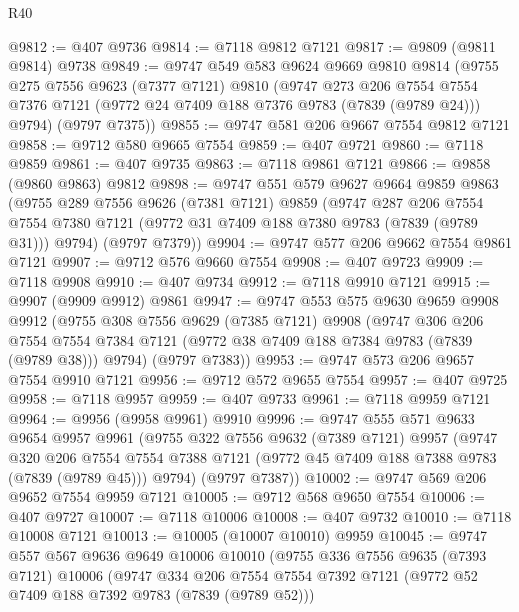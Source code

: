 \begin{lexlean}{R40}
\begin{coremodule}
@9812 := @407 @9736
@9814 := @7118 @9812 @7121
@9817 := @9809 (@9811 @9814) @9738
@9849 := @9747
    @549
    @583
    @9624
    @9669
    @9810
    @9814
    (@9755
      @275
      @7556
      @9623
      (@7377 @7121)
      @9810
      (@9747
        @273
        @206
        @7554
        @7554
        @7376
        @7121
        (@9772 @24 @7409 @188 @7376 @9783 (@7839 (@9789 @24)))
        @9794)
      (@9797 @7375))
@9855 := @9747 @581 @206 @9667 @7554 @9812 @7121
@9858 := @9712 @580 @9665 @7554
@9859 := @407 @9721
@9860 := @7118 @9859
@9861 := @407 @9735
@9863 := @7118 @9861 @7121
@9866 := @9858 (@9860 @9863) @9812
@9898 := @9747
    @551
    @579
    @9627
    @9664
    @9859
    @9863
    (@9755
      @289
      @7556
      @9626
      (@7381 @7121)
      @9859
      (@9747
        @287
        @206
        @7554
        @7554
        @7380
        @7121
        (@9772 @31 @7409 @188 @7380 @9783 (@7839 (@9789 @31)))
        @9794)
      (@9797 @7379))
@9904 := @9747 @577 @206 @9662 @7554 @9861 @7121
@9907 := @9712 @576 @9660 @7554
@9908 := @407 @9723
@9909 := @7118 @9908
@9910 := @407 @9734
@9912 := @7118 @9910 @7121
@9915 := @9907 (@9909 @9912) @9861
@9947 := @9747
    @553
    @575
    @9630
    @9659
    @9908
    @9912
    (@9755
      @308
      @7556
      @9629
      (@7385 @7121)
      @9908
      (@9747
        @306
        @206
        @7554
        @7554
        @7384
        @7121
        (@9772 @38 @7409 @188 @7384 @9783 (@7839 (@9789 @38)))
        @9794)
      (@9797 @7383))
@9953 := @9747 @573 @206 @9657 @7554 @9910 @7121
@9956 := @9712 @572 @9655 @7554
@9957 := @407 @9725
@9958 := @7118 @9957
@9959 := @407 @9733
@9961 := @7118 @9959 @7121
@9964 := @9956 (@9958 @9961) @9910
@9996 := @9747
    @555
    @571
    @9633
    @9654
    @9957
    @9961
    (@9755
      @322
      @7556
      @9632
      (@7389 @7121)
      @9957
      (@9747
        @320
        @206
        @7554
        @7554
        @7388
        @7121
        (@9772 @45 @7409 @188 @7388 @9783 (@7839 (@9789 @45)))
        @9794)
      (@9797 @7387))
@10002 := @9747 @569 @206 @9652 @7554 @9959 @7121
@10005 := @9712 @568 @9650 @7554
@10006 := @407 @9727
@10007 := @7118 @10006
@10008 := @407 @9732
@10010 := @7118 @10008 @7121
@10013 := @10005 (@10007 @10010) @9959
@10045 := @9747
    @557
    @567
    @9636
    @9649
    @10006
    @10010
    (@9755
      @336
      @7556
      @9635
      (@7393 @7121)
      @10006
      (@9747
        @334
        @206
        @7554
        @7554
        @7392
        @7121
        (@9772 @52 @7409 @188 @7392 @9783 (@7839 (@9789 @52)))

\end{coremodule}
\end{lexlean}
